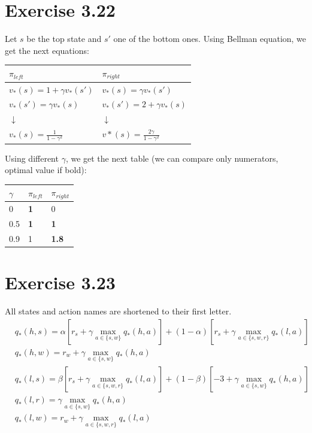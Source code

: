 \documentclass[12pt, a4paper]{article}
\begin{document}
    \section{Exercise 3.22}
        Let $s$ be the top state and $s'$ one of the bottom ones. Using Bellman
        equation, we get the next equations:
        \begin{table}[H]
        \centering
            \begin{tabular}{l|l}
                $\pi_{left}$ & $\pi_{right}$ \\ \hline
                $v_*(s) = 1 + \gamma v_*(s')$ & $v_*(s) = \gamma v_*(s')$ \\
                $v_*(s') = \gamma v_*(s)$ & $v_*(s') = 2 + \gamma v_*(s)$ \\
                $\downarrow$ & $\downarrow$ \\
                $v_*(s) = \frac{1}{1 - \gamma^2}$ & $v*(s) = \frac{2\gamma}{1 - \gamma^2}$ \\
            \end{tabular}
        \end{table}

        Using different $\gamma$, we get the next table (we can compare only
        numerators, optimal value if bold):
        \begin{table}[H]
        \centering
            \begin{tabular}{l|l|l}
                $\gamma$ & $\pi_{left}$ & $\pi_{right}$ \\ \hline
                0 & \textbf{1} & 0 \\
                0.5 & \textbf{1} & \textbf{1} \\
                0.9 & 1 & \textbf{1.8} \\
            \end{tabular}
        \end{table}

    \section{Exercise 3.23}
        All states and action names are shortened to their first letter.
        \begin{align*}
            &q_*(h,s) = \alpha [r_s + \gamma \max\limits_{a \in \{s, w\}} q_*(h, a)] +
            (1 - \alpha) [r_s + \gamma \max\limits_{a \in \{s, w, r\}} q_*(l, a)]\\
            &q_*(h,w) = r_w + \gamma \max\limits_{a \in \{s, w\}} q_*(h, a)\\
            &q_*(l,s) = \beta [r_s + \gamma \max\limits_{a \in \{s, w, r\}} q_*(l, a)] +
            (1 - \beta) [-3 + \gamma \max\limits_{a \in \{s, w\}} q_*(h, a)]\\
            &q_*(l,r) = \gamma \max\limits_{a \in \{s, w\}} q_*(h, a)\\
            &q_*(l,w) = r_w + \gamma \max\limits_{a \in \{s, w, r\}} q_*(l, a)\\
        \end{align*}
\end{document}
